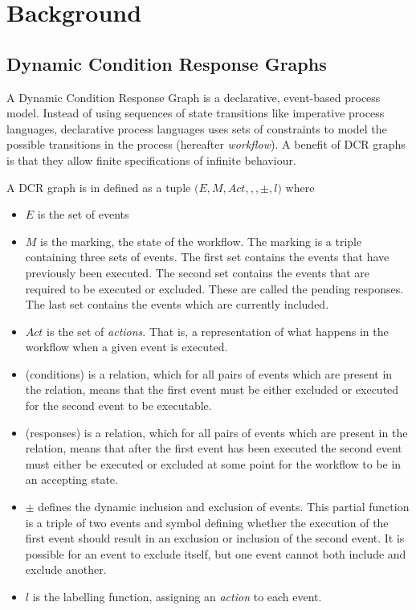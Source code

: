 \chapter{Background}\label{chap:background}
	\section{Dynamic Condition Response Graphs}\label{sec:background:dcrgraphs}
	A Dynamic Condition Response Graph is a declarative, event-based process model. Instead of using sequences of state transitions like imperative process languages, declarative process languages uses sets of constraints to model the possible transitions in the process (hereafter \textit{workflow}). A benefit of DCR graphs is that they allow finite specifications of infinite behaviour.

	
	\newpar A DCR graph is in \cite{hildebrandt2011declarative} defined as a tuple $(E, M, Act, $\condition$, $\response$, \pm, l)$ where
	\begin{itemize}
		\item $E$ is the set of events
		\item $M$ is the marking, the state of the workflow. The marking is a triple containing three sets of events. The first set contains the events that have previously been executed. The second set contains the events that are required to be executed or excluded. These are called the pending responses. The last set contains the events which are currently included.
		\item $Act$ is the set of \textit{actions}. That is, a representation of what happens in the workflow when a given event is executed.
		\item \condition (conditions) is a relation, which for all pairs of events which are present in the relation, means that the first event must be either excluded or executed for the second event to be executable.
		\item \response (responses) is a relation, which for all pairs of events which are present in the relation, means that after the first event has been executed the second event must either be executed or excluded at some point for the workflow to be in an accepting state.
		\item $\pm$ defines the dynamic inclusion and exclusion of events. This partial function is a triple of two events and symbol defining whether the execution of the first event should result in an exclusion or inclusion of the second event. It is possible for an event to exclude itself, but one event cannot both include and exclude another.
		\item $l$ is the labelling function, assigning an \textit{action} to each event.
	\end{itemize}
		
